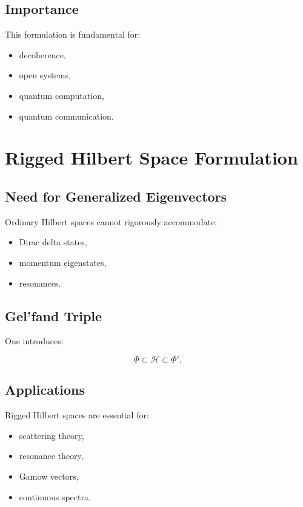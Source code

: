 \documentclass[11pt]{article}
\begin{document}
\subsection{Importance}

This formulation is fundamental for:

\begin{itemize}
\item decoherence,
\item open systems,
\item quantum computation,
\item quantum communication.
\end{itemize}

\section{Rigged Hilbert Space Formulation}

\subsection{Need for Generalized Eigenvectors}

Ordinary Hilbert spaces cannot rigorously accommodate:

\begin{itemize}
\item Dirac delta states,
\item momentum eigenstates,
\item resonances.
\end{itemize}

\subsection{Gel'fand Triple}

One introduces:

\[
\Phi
\subset
\mathcal H
\subset
\Phi'.
\]

\subsection{Applications}

Rigged Hilbert spaces are essential for:

\begin{itemize}
\item scattering theory,
\item resonance theory,
\item Gamow vectors,
\item continuous spectra.
\end{itemize}
\end{document}
